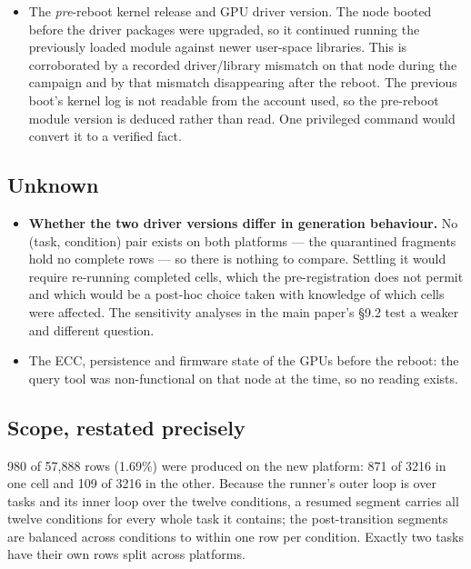 \documentclass[10pt]{article}
\begin{document}
\begin{itemize}[leftmargin=1.4em,itemsep=1pt]
\item The \emph{pre}-reboot kernel release and GPU driver version. The node booted before the driver packages were
upgraded, so it continued running the previously loaded module against newer user-space libraries. This is
corroborated by a recorded driver/library mismatch on that node during the campaign and by that mismatch
disappearing after the reboot. The previous boot's kernel log is not readable from the account used, so the
pre-reboot module version is deduced rather than read. One privileged command would convert it to a verified fact.
\end{itemize}

\subsection{Unknown}

\begin{itemize}[leftmargin=1.4em,itemsep=1pt]
\item \textbf{Whether the two driver versions differ in generation behaviour.} No (task, condition) pair exists on
both platforms --- the quarantined fragments hold no complete rows --- so there is nothing to compare. Settling it
would require re-running completed cells, which the pre-registration does not permit and which would be a post-hoc
choice taken with knowledge of which cells were affected. The sensitivity analyses in the main paper's \S9.2
test a weaker and different question.
\item The ECC, persistence and firmware state of the GPUs before the reboot: the query tool was non-functional on
that node at the time, so no reading exists.
\end{itemize}

\subsection{Scope, restated precisely}

980 of 57{,}888 rows (1.69\%) were produced on the new platform: 871 of 3216 in one cell and 109 of 3216 in the
other. Because the runner's outer loop is over tasks and its inner loop over the twelve conditions, a resumed
segment carries all twelve conditions for every whole task it contains; the post-transition segments are balanced
across conditions to within one row per condition. Exactly two tasks have their own rows split across platforms.
\end{document}
